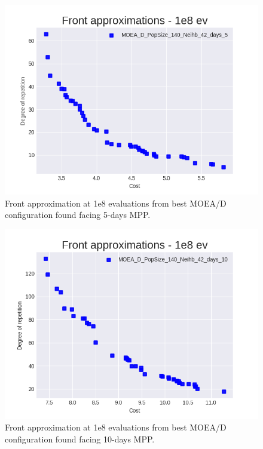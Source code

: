 \begin{figure}[H]
  \centering
  \includegraphics[width=1.0\linewidth]{../experiments/plots/fronts/5_days/MOEA_D_PopSize_140_Neihb_42_days_5_6.png}
\caption{Front approximation at 1e8 evaluations from best MOEA/D configuration found facing 5-days MPP.}
\label{fig:front_comp_1}
\end{figure}

\begin{figure}[H]
  \centering
  \includegraphics[width=1.0\linewidth]{../experiments/plots/fronts/10_days/MOEA_D_PopSize_140_Neihb_42_days_10_10.png}
\caption{Front approximation at 1e8 evaluations from best MOEA/D configuration found facing 10-days MPP.}
\label{fig:front_comp_2}
\end{figure}

